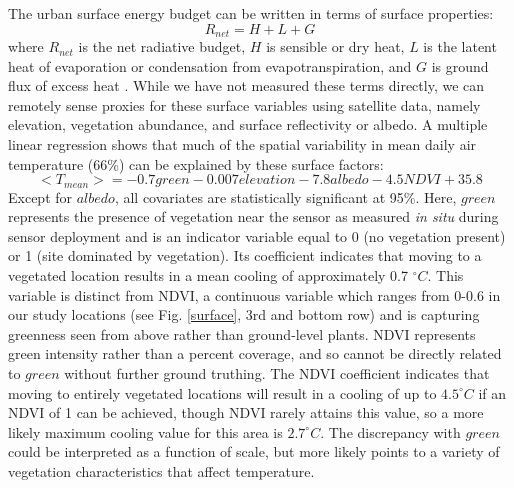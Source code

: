 The urban surface energy budget can be written in terms of surface properties: 
\[R_{net} = H+L+G\] where $R_{net}$ is the net radiative budget, $H$ is sensible or dry heat, $L$ is the latent heat of evaporation or condensation from evapotranspiration, and $G$ is ground flux of excess heat \citep{li2013synergistic}. 
While we have not measured these terms directly, we can remotely sense proxies for these surface variables using satellite data, namely elevation, vegetation abundance, and surface reflectivity or albedo. 
A multiple linear regression  shows that much of the spatial variability in mean daily air temperature (66\%) can be explained by these surface factors: 
\[ <T_{mean}> =  -0.7 green -0.007 elevation -7.8 albedo - 4.5 NDVI+ 35.8\]
Except for $albedo$, all covariates are statistically significant at 95\%. 
Here, $green$ represents the presence of vegetation near the sensor as measured \textit{in situ} during sensor deployment and is an indicator variable equal to 0 (no vegetation present) or 1 (site dominated by vegetation). Its coefficient indicates that moving to a vegetated location results in a mean cooling of approximately 0.7 $^\circ C$. This variable is distinct from NDVI, a continuous variable which ranges from 0-0.6 in our study locations (see Fig. \ref{surface}, 3rd and bottom row) and is capturing greenness seen from above rather than ground-level plants. NDVI represents green intensity rather than a percent coverage, and so cannot be directly related to $green$ without further ground truthing. 
The NDVI coefficient indicates that moving to entirely vegetated locations will result in a cooling of up to $4.5 ^\circ C$ if an NDVI of 1 can be achieved, though NDVI rarely attains this value, so a more likely maximum cooling value for this area is $2.7^\circ C $. The discrepancy with $green$ could be interpreted as a function of scale, but more likely points to a variety of vegetation characteristics that affect temperature.  %
 
